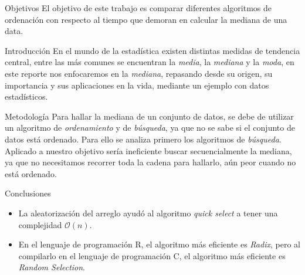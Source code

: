 \documentclass[final]{beamer}
\newlength{\onecolwid}
\begin{document}
\begin{frame}[t]
\begin{columns}[t]
\begin{column}{\onecolwid}
			\begin{block}{Objetivos}
       El objetivo de este trabajo es comparar diferentes algoritmos de ordenación con respecto al tiempo  que demoran en calcular la mediana de una data.
			\end{block}
			\vspace{0.5cm}
			\begin{block}{Introducción}
       En el mundo de la estadística existen distintas medidas de tendencia central, entre las más comunes se encuentran la \emph{media}, la \emph{mediana} y la \emph{moda}, en este reporte nos enfocaremos en la \emph{mediana}, repasando desde su origen, su importancia y sus aplicaciones en la vida, mediante un ejemplo con datos estadísticos.
			\end{block}
			\vspace{0.5cm}
         \begin{block}{Metodología}%
          Para hallar la mediana de un conjunto de datos, se debe de utilizar un algoritmo de \emph{ordenamiento} y de \emph{búsqueda}, ya que no se sabe si el conjunto de datos está ordenado. Para ello se analiza primero los algoritmos de \emph{búsqueda}.\\[\baselineskip]
         	Aplicado a nuestro objetivo sería ineficiente buscar secuencialmente la mediana, ya que no necesitamos recorrer toda la cadena para hallarlo, aún peor cuando no está ordenado.
          \end{block}
          \vspace{0.5cm}
          \begin{block}{Conclusiones}
          \begin{itemize}
          	\item La aleatorización del arreglo ayudó al algoritmo \emph{quick select} a tener una complejidad $\mathcal{O}(n)$.
          	\item En el lenguaje de programación R, el algoritmo más eficiente es \emph{Radix}, pero al compilarlo en el lenguaje de programación C, el algoritmo más eficiente es \emph{Random Selection}.
          \end{itemize}
          \end{block}
        

\end{column}
\end{columns}
\end{frame}
\end{document}
